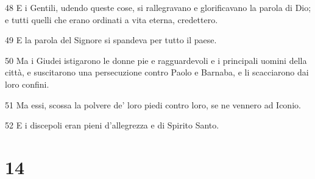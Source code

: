 \par 48 E i Gentili, udendo queste cose, si rallegravano e glorificavano la parola di Dio; e tutti quelli che erano ordinati a vita eterna, credettero.
\par 49 E la parola del Signore si spandeva per tutto il paese.
\par 50 Ma i Giudei istigarono le donne pie e ragguardevoli e i principali uomini della città, e suscitarono una persecuzione contro Paolo e Barnaba, e li scacciarono dai loro confini.
\par 51 Ma essi, scossa la polvere de' loro piedi contro loro, se ne vennero ad Iconio.
\par 52 E i discepoli eran pieni d'allegrezza e di Spirito Santo.

\chapter{14}

